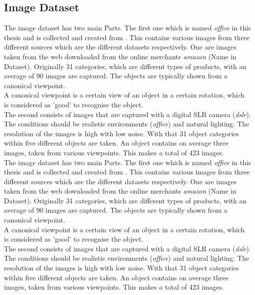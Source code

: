 \subsection{Image Dataset}\label{EmSubSecIm}
The image dataset has two main Parts. 
The first one which is named \textit{office} in this thesis and is collected and created from \cite{Saenko.2010}.
This contains various images from three different sources which are the different datasets respectively.
One are images taken from the web downloaded from the online merchants \textit{amazon} (Name in Dataset).
Originally 31 categories, which are different types of products, with an average of 90 images are captured.
The objects are typically shown from a canonical viewpoint.\\
A canonical viewpoint is a certain view of an object in a certain rotation, which is considered as 'good' to recognise the object. \cite{Edelman.1991}\\
The second consists of images that are captured with a digital SLR camera (\textit{dslr}).
The conditions should be realistic environments (\textit{office}) and natural lighting.
The resolution of the images is high with low noise.
With that 31 object categories within five different objects are taken.
An object contains on average three images, taken from various viewpoints.
This makes a total of 423 images.\\
The image dataset has two main Parts. 
The first one which is named \textit{office} in this thesis and is collected and created from \cite{Saenko.2010}.
This contains various images from three different sources which are the different datasets respectively.
One are images taken from the web downloaded from the online merchants \textit{amazon} (Name in Dataset).
Originally 31 categories, which are different types of products, with an average of 90 images are captured.
The objects are typically shown from a canonical viewpoint.\\
A canonical viewpoint is a certain view of an object in a certain rotation, which is considered as 'good' to recognise the object. \cite{Edelman.1991}\\
The second consists of images that are captured with a digital SLR camera (\textit{dslr}).
The conditions should be realistic environments (\textit{office}) and natural lighting.
The resolution of the images is high with low noise.
With that 31 object categories within five different objects are taken.
An object contains on average three images, taken from various viewpoints.
This makes a total of 423 images.
